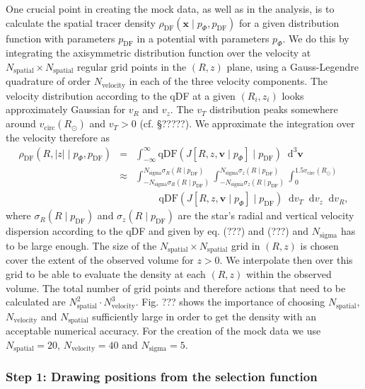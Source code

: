 \documentclass[12pt,preprint]{aastex}
\newcommand{\vect}[1]{\boldsymbol{#1}} %
\newcommand*\diff{\mathop{}\!\mathrm{d}}
\newcommand*\Diff[1]{\mathop{}\!\mathrm{d^#1}}
\begin{document}
One crucial point in creating the mock data, as well as in the analysis, is to calculate the spatial tracer density $\rho_\text{DF}(\vect{x} \mid p_{\Phi},p_\text{DF})$ for a given distribution function with parameters $p_\text{DF}$ in a potential with parameters $p_{\Phi}$. We do this by integrating the axisymmetric distribution function over the velocity at $N_\text{spatial} \times N_\text{spatial}$ regular grid points in the $(R,z)$ plane, using a Gauss-Legendre quadrature of order $N_\text{velocity}$ in each of the three velocity components. The velocity distribution according to the qDF at a given $(R_i,z_i)$ looks approximately Gaussian for $v_R$ and $v_z$. The $v_T$ distribution peaks somewhere around $v_\text{circ}(R_\odot)$ and $v_T > 0$ (cf. \S ?????). We approximate the integration over the velocity therefore as
\begin{eqnarray}
\rho_\text{DF}(R,|z| \mid p_{\Phi},p_\text{DF}) &=& \int_{-\infty}^{\infty} \text{qDF}(J[R,z,\vect{v} \mid p_{\Phi}] \mid p_\text{DF}) \Diff3\vect{v}  \label{eq:tracerdensity_general}\\
&\approx& \int_{-N_\text{sigma} \sigma_R(R \mid p_\text{DF})}^{N_\text{sigma} \sigma_R(R \mid p_\text{DF})} \int_{-N_\text{sigma}\sigma_z(R \mid p_\text{DF})}^{N_\text{sigma} \sigma_z(R \mid p_\text{DF})} \int_{0}^{1.5 v_\text{circ}(R_\odot)}  \nonumber\\
& & \hspace{1cm} \text{qDF}(J[R,z,\vect{v} \mid p_{\Phi}] \mid p_\text{DF}) \diff v_T \diff v_z \diff v_R, \label{eq:tracerdensity}
\end{eqnarray}
where $\sigma_R(R \mid p_\text{DF})$ and $\sigma_z(R \mid p_\text{DF})$ are the star's radial and vertical velocity dispersion according to the qDF and given by eq. (???) and (???) and $N_\text{sigma}$ has to be large enough. The size of the $N_\text{spatial} \times N_\text{spatial}$ grid in $(R,z)$ is chosen cover the extent of the observed volume for $z>0$. We interpolate then over this grid to be able to evaluate the density at each $(R,z)$ within the observed volume. The total number of grid points and therefore actions that need to be calculated are $N_\text{spatial}^2 \cdot N_\text{velocity}^3$. Fig. ??? shows the importance of choosing $N_\text{spatial}$, $N_\text{velocity}$ and $N_\text{spatial}$ sufficiently large in order to get the density with an acceptable numerical accuracy. For the creation of the mock data we use $N_\text{spatial} = 20$, $N_\text{velocity} = 40$ and $N_\text{sigma}=5$.

\subsubsection{Step 1: Drawing positions from the selection function}
\end{document}
